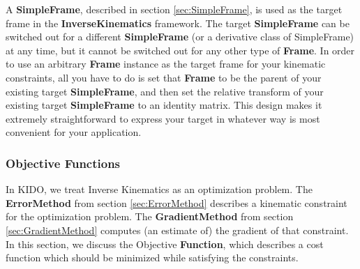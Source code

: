 A \textbf{SimpleFrame}, described in section \ref{sec:SimpleFrame}, is used as the target frame in the \textbf{InverseKinematics} framework. The target \textbf{SimpleFrame} can be  switched out for a different \textbf{SimpleFrame} (or a derivative class of SimpleFrame) at any time, but it cannot be switched out for any other type of \textbf{Frame}. In order to use an arbitrary \textbf{Frame} instance as the target frame for your kinematic constraints, all you have to do is set that \textbf{Frame} to be the parent of your existing target \textbf{SimpleFrame}, and then set the relative transform of your existing target \textbf{SimpleFrame} to an identity matrix. This design makes it extremely straightforward to express your target in whatever way is most convenient for your application.

\subsubsection{Objective Functions}

In KIDO, we treat Inverse Kinematics as an optimization problem. The \textbf{ErrorMethod} from section \ref{sec:ErrorMethod} describes a kinematic constraint for the optimization problem. The \textbf{GradientMethod} from section \ref{sec:GradientMethod} computes (an estimate of) the gradient of that constraint. In this section, we discuss the Objective \textbf{Function}, which describes a cost function which should be minimized while satisfying the constraints.

